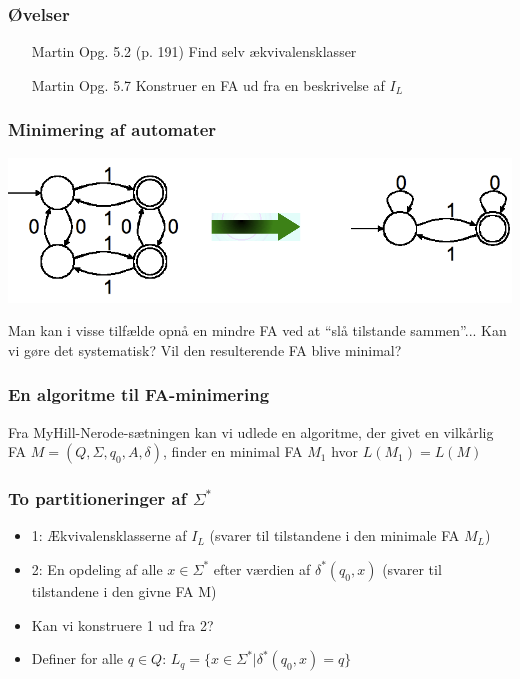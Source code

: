 \documentclass[]{beamer}
\begin{document}
\begin{frame}
  \frametitle{Øvelser}
\begin{itemize}
\item [Martin] Opg. 5.2 (p. 191)
  Find selv ækvivalensklasser
\item [Martin] Opg. 5.7
  Konstruer en FA ud fra en beskrivelse af $I_L$
\end{itemize}
\end{frame}

\begin{frame}
\frametitle{Minimering af automater}
\includegraphics[scale=0.4]{images/2_seminar_minimize}

Man kan i visse tilfælde opnå en mindre FA 
ved at “slå tilstande sammen”...
Kan vi gøre det systematisk?
Vil den resulterende FA blive minimal?
\end{frame}

\begin{frame}
\frametitle{En algoritme til FA-minimering}
Fra MyHill-Nerode-sætningen kan vi udlede
en algoritme, der 
givet en vilkårlig FA $M=(Q, \Sigma , q_0, A, \delta)$, 
finder en minimal FA $M_1$ hvor $L(M_1)=L(M)$
\end{frame}

\begin{frame}
\frametitle{To partitioneringer af $\Sigma^*$}
\begin{itemize}[<+->]
\item 1:	Ækvivalensklasserne af $I_L$
(svarer til tilstandene i den minimale FA $M_L$)
\item 2:	En opdeling af alle $x\in \Sigma^*$ efter værdien af $\delta^*(q_0, x)$
(svarer til tilstandene i den givne FA M)	
\item Kan vi konstruere 1 ud fra 2?
\item Definer for alle $q\in Q$:
	$L_q = \{ x\in \Sigma^* | \delta^*(q_0, x) = q \}$
\end{itemize}
\end{frame}
\end{document}

